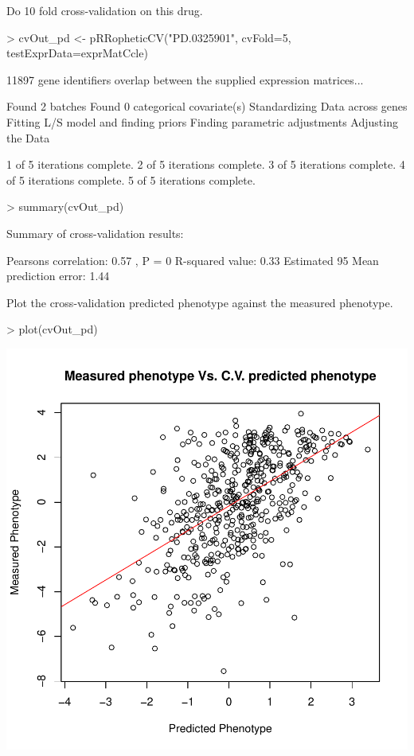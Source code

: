 \documentclass[a4paper]{article}
\begin{document}
Do 10 fold cross-validation on this drug.
\begin{Schunk}
\begin{Sinput}
> cvOut_pd <- pRRopheticCV("PD.0325901", cvFold=5, testExprData=exprMatCcle)
\end{Sinput}
\begin{Soutput}
 11897  gene identifiers overlap between the supplied expression matrices... 
 
Found 2 batches
Found 0  categorical covariate(s)
Standardizing Data across genes
Fitting L/S model and finding priors
Finding parametric adjustments
Adjusting the Data

1 of 5 iterations complete.
2 of 5 iterations complete.
3 of 5 iterations complete.
4 of 5 iterations complete.
5 of 5 iterations complete.
\end{Soutput}
\begin{Sinput}
> summary(cvOut_pd)
\end{Sinput}
\begin{Soutput}
Summary of cross-validation results:

Pearsons correlation: 0.57 , P =  0 
R-squared value: 0.33
Estimated 95%
Mean prediction error: 1.44
\end{Soutput}
\end{Schunk}

Plot the cross-validation predicted phenotype against the measured phenotype.
\begin{Schunk}
\begin{Sinput}
> plot(cvOut_pd)
\end{Sinput}
\end{Schunk}
\includegraphics{vignetteOutline-011}
\end{document}
